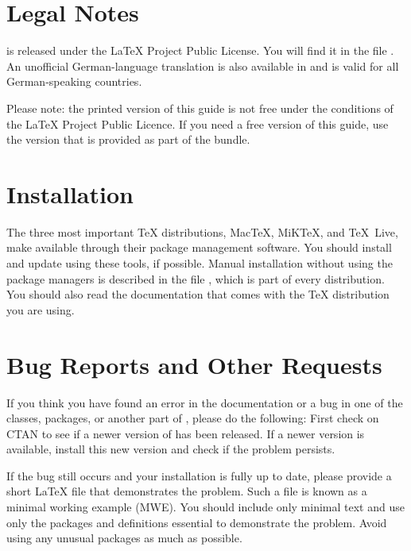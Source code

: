 \section{Legal Notes}

{\KOMAScript} is released under the {\LaTeX} Project Public License. You will
find it in the file . An unofficial German-language translation
is also available in  and is valid for all German-speaking
countries.

%
{Please note: the printed version of this guide is not free under the
  conditions of the {\LaTeX} Project Public Licence. If you need a free
  version of this guide, use the version that is provided as part of the
  {\KOMAScript} bundle.}


\section{Installation}

The three most important \TeX{} distributions, Mac\TeX, MiK\TeX, and
\TeX{}~Live, make {\KOMAScript} available through their package management
software. You should install and update {\KOMAScript} using these tools, if
possible. Manual installation without using the package managers is described
in the file , which is part of every {\KOMAScript}
distribution. You should also read the documentation that comes with the
{\TeX} distribution you are using.


\section{Bug Reports and Other Requests}

If you think you have found an error in the documentation or a bug in one of
the {\KOMAScript} classes, packages, or another part of {\KOMAScript}, please
do the following: First check on CTAN to see if a newer version of
{\KOMAScript} has been released. If a newer version is available, install this
new version and check if the problem persists.

If the bug still occurs and your installation is fully up to date, please
provide a short {\LaTeX} file that demonstrates the problem. Such a file is
known as a minimal working example (MWE). You should include only minimal text
and use only the packages and definitions essential to demonstrate the
problem. Avoid using any unusual packages as much as possible.

